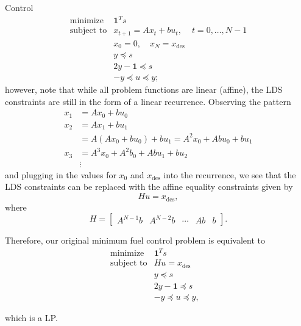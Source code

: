 \begin{chapter}{Control}
    \[\begin{array}{lll}
        \text{minimize} \; & \bm{1}^T s & \\
        \text{subject to} & x_{t+1} = Ax_t + bu_t, \; & t=0, \ldots, N-1 \\
        & x_0 = 0, \quad x_{N} = x_{\text{des}} & \\
        & y \preceq s & \\
        & 2y - \bm{1} \preceq s & \\
        & -y \preceq u \preceq y; & 
        \end{array}\]
    however, note that while all problem functions are linear (affine), the LDS constraints 
    are still in the form of a linear recurrence. Observing the pattern
    \[\begin{aligned}
        x_1 &= Ax_0 + bu_0 \\
        x_2 &= Ax_1 + bu_1 \\
        &= A(Ax_0 + bu_0)+ bu_1 = A^2x_0 + Abu_0 + bu_1 \\
        x_3 &= A^3x_0 + A^2b_0 + Abu_1 + bu_2 \\
        &\vdots
    \end{aligned}\]
    and plugging in the values for $x_0$ and $x_{\mathrm{des}}$ into the recurrence, we see that the LDS
    constraints can be replaced with the affine equality constraints given by
    \[Hu = x_{\mathrm{des}},\]
    where 
    \[H = \begin{bmatrix}
        A^{N-1}b & A^{N-2}b & \cdots & Ab & b
    \end{bmatrix}.\]

    Therefore, our original minimum fuel control problem is equivalent to
    \[\begin{array}{lll}
        \text{minimize} \; & \bm{1}^T s & \\
        \text{subject to} & Hu = x_{\mathrm{des}} \; &\\
        & y \preceq s & \\
        & 2y - \bm{1} \preceq s & \\
        & -y \preceq u \preceq y, & 
        \end{array}\]
    
    which is a LP.
    

\end{chapter}
